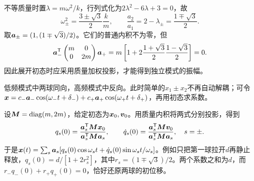 \begin{solution}
不等质量时置$\lambda=m\omega^2/k$，行列式化为$2\lambda^2-6\lambda+3=0$，故
\[
 \boxed{\omega_\pm^2=\frac{3\pm\sqrt3}{2}\frac km,\qquad
 \frac{a_2}{a_1}=2-\lambda_\pm=\frac{1\mp\sqrt3}{2}}.
\]
取$\bm{a}_\pm=(1,(1\mp\sqrt3)/2)$。它们的普通内积不为零，但
\[
 \bm{a}_-^{\mathsf T}\begin{pmatrix}m&0\\0&2m\end{pmatrix}\bm{a}_+
 =m\left[1+2\frac{1+\sqrt3}{2}\frac{1-\sqrt3}{2}\right]=0.
\]
因此展开初态时应采用质量加权投影，才能得到独立模式的振幅。

低频模式中两球同向，高频模式中反向。此时简单的$x_1\pm x_2$不再自动解耦；可令$\bm{x}=c_-\bm{a}_-\cos(\omega_-t+\delta_-)+c_+\bm{a}_+\cos(\omega_+t+\delta_+)$，再用初态求系数。


设$\bm{M}=\operatorname{diag}(m,2m)$，给定初态为$\bm{x}_0,\bm{v}_0$。用质量内积将两式分别投影，得到
\[
 q_s(0)=\frac{\bm{a}_s^{\mathsf T}\bm{M}\bm{x}_0}{\bm{a}_s^{\mathsf T}\bm{M}\bm{a}_s},\qquad
 \dot q_s(0)=\frac{\bm{a}_s^{\mathsf T}\bm{M}\bm{v}_0}{\bm{a}_s^{\mathsf T}\bm{M}\bm{a}_s},
 \quad s=\pm.
\]
于是$\bm{x}(t)=\sum_s\bm{a}_s[q_s(0)\cos\omega_st+\dot q_s(0)\sin\omega_st/\omega_s]$。例如只把第一球拉开$d$再静止释放，$q_s(0)=d/[1+2r_s^2]$，其中$r_s=(1\mp\sqrt3)/2$。两个系数之和为$d$，而$r_-q_-(0)+r_+q_+(0)=0$，恰好还原两球的初位移。

\end{solution}



